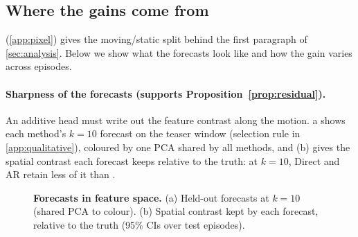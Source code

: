 \subsection{Where the gains come from}\label{app:analysis}
 (\cref{app:pixel}) gives the moving/static split behind the first paragraph of \cref{sec:analysis}.
Below we show what the forecasts look like and how the gain varies across episodes.
\paragraph{Sharpness of the forecasts (supports Proposition~\ref{prop:residual}).} An additive head must write out the
feature contrast along the motion. a shows each method's $k{=}10$ forecast on the teaser window
(selection rule in \cref{app:qualitative}), coloured by one PCA shared by all methods, and (b) gives the spatial
contrast each forecast keeps relative to the truth: at $k{=}10$, Direct and AR retain less of it than \ours{}.
\begin{figure}[h]
  \centering
  \caption{\textbf{Forecasts in feature space.} (a) Held-out forecasts at $k{=}10$ (shared PCA to colour). (b) Spatial contrast kept by each forecast, relative to the truth (95\% CIs over test episodes).}
  \label{fig:mechanism}
\end{figure}
